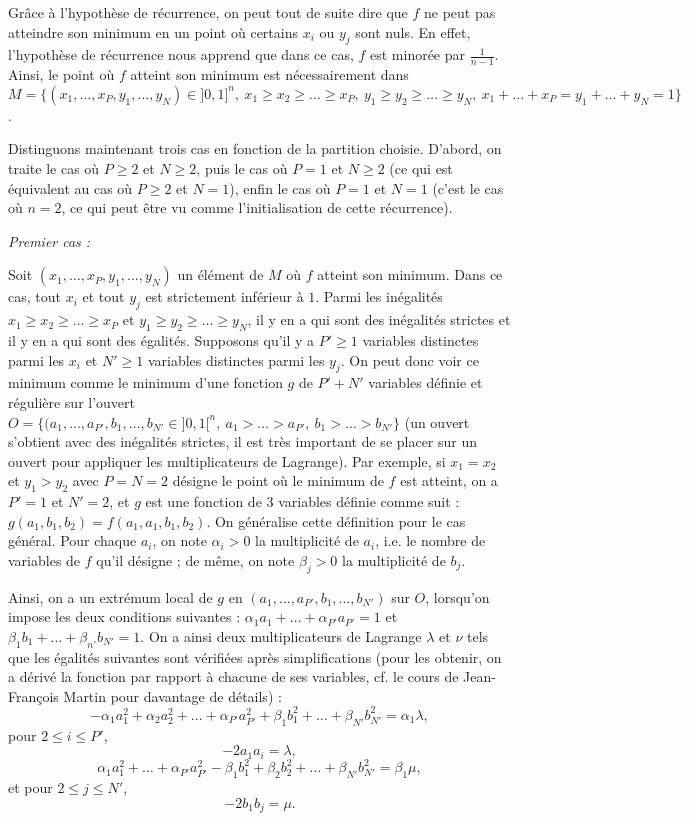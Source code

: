 \begin{sol}
Grâce à l'hypothèse de récurrence, on peut tout de suite dire que $f$ ne peut pas atteindre son minimum en un point où certains $x_i$ ou $y_j$ sont nuls. En effet, l'hypothèse de récurrence nous apprend que dans ce cas, $f$ est minorée par $\frac1{n-1}$. Ainsi, le point où $f$ atteint son minimum est nécessairement dans $M=\{(x_1,\dots,x_P,y_1,\dots,y_N) \in ]0,1]^{n},\ x_1 \geq x_2 \geq \dots \geq x_P,\ y_1 \geq y_2 \geq \dots \geq y_N,\ x_1 + \dots + x_P = y_1 + \dots + y_N = 1 \}$.

Distinguons maintenant trois cas en fonction de la partition choisie. D'abord, on traite le cas où $P \geq 2$ et $N \geq 2$, puis le cas où $P=1$ et $N \geq 2$ (ce qui est équivalent au cas où $P \geq 2$ et $N=1$), enfin le cas où $P=1$ et $N=1$ (c'est le cas où $n=2$, ce qui peut être vu comme l'initialisation de cette récurrence).

\textit{Premier cas :}

Soit $(x_1,\dots,x_P,y_1,\dots,y_N)$ un élément de $M$ où $f$ atteint son minimum. Dans ce cas, tout $x_i$ et tout $y_j$ est strictement inférieur à $1$. Parmi les inégalités $x_1 \geq x_2 \geq \dots \geq x_P$ et $y_1 \geq y_2 \geq \dots \geq y_N$, il y en a qui sont des inégalités strictes et il y en a qui sont des égalités. Supposons qu'il y a $P' \geq 1$ variables distinctes parmi les $x_i$ et $N' \geq 1$ variables distinctes parmi les $y_j$. On peut donc voir ce minimum comme le minimum d'une fonction $g$ de $P'+N'$ variables définie et régulière sur l'ouvert $O=\{(a_1,\dots,a_{P'},b_1,\dots,b_{N'} \in ]0,1[^n,\ a_1>\dots>a_{P'},\ b_1>\dots>b_{N'}\}$ (un ouvert s'obtient avec des inégalités strictes, il est très important de se placer sur un ouvert pour appliquer les multiplicateurs de Lagrange). Par exemple, si $x_1=x_2$ et $y_1>y_2$ avec $P=N=2$ désigne le point où le minimum de $f$ est atteint, on a $P'=1$ et $N'=2$, et $g$ est une fonction de $3$ variables définie comme suit : $g(a_1,b_1,b_2)=f(a_1,a_1,b_1,b_2)$. On généralise cette définition pour le cas général. Pour chaque $a_i$, on note $\alpha_i>0$ la multiplicité de $a_i$, i.e. le nombre de variables de $f$ qu'il désigne ; de même, on note $\beta_j>0$ la multiplicité de $b_j$.

Ainsi, on a un extrémum local de $g$ en $(a_1,\dots,a_{P'},b_1,\dots,b_{N'})$ sur $O$, lorsqu'on impose les deux conditions suivantes : $\alpha_1 a_1 +\dots+ \alpha_{P'} a_{P'} =1$ et $\beta_1 b_1 +\dots+ \beta_{n'} b_{N'} =1$. On a ainsi deux multiplicateurs de Lagrange $\lambda$ et $\nu$ tels que les égalités suivantes sont vérifiées après simplifications (pour les obtenir, on a dérivé la fonction par rapport à chacune de ses variables, cf. le cours de Jean-François Martin pour davantage de détails) :
\[
-\alpha_1 a_1^2 + \alpha_2 a_2^2 +\dots+ \alpha_{P'} a_{P'}^2 + \beta_1 b_1^2 +\dots+\beta_{N'} b_{N'}^2 = \alpha_1 \lambda,
\]
pour $2 \leq i \leq P'$,
\[
-2 a_1 a_i = \lambda,
\]
\[
\alpha_1 a_1^2 +\dots+ \alpha_{P'} a_{P'}^2 -\beta_1 b_1^2 +\beta_2 b_2^2 +\dots+\beta_{N'} b_{N'}^2 = \beta_1 \mu,
\]
et pour $2 \leq j \leq N'$,
\[
-2 b_1 b_j =\mu.
\]


\end{sol}
